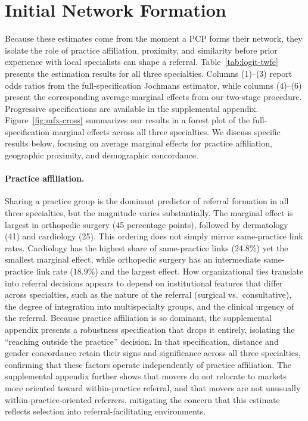 \documentclass[12pt]{article}
\begin{document}

\section{Initial Network Formation}
\label{sec:formation}

Because these estimates come from the moment a PCP forms their network, they isolate the role of practice affiliation, proximity, and similarity before prior experience with local specialists can shape a referral. Table~\ref{tab:logit-twfe} presents the estimation results for all three specialties. Columns (1)--(3) report odds ratios from the full-specification Jochmans estimator, while columns (4)--(6) present the corresponding average marginal effects from our two-stage procedure. Progressive specifications are available in the supplemental appendix. Figure~\ref{fig:mfx-cross} summarizes our results in a forest plot of the full-specification marginal effects across all three specialties. We discuss specific results below, focusing on average marginal effects for practice affiliation, geographic proximity, and demographic concordance.

\paragraph{Practice affiliation.} Sharing a practice group is the dominant predictor of referral formation in all three specialties, but the magnitude varies substantially. The marginal effect is largest in orthopedic surgery (45 percentage points), followed by dermatology (41) and cardiology (25). This ordering does not simply mirror same-practice link rates. Cardiology has the highest share of same-practice links (24.8\%) yet the smallest marginal effect, while orthopedic surgery has an intermediate same-practice link rate (18.9\%) and the largest effect. How organizational ties translate into referral decisions appears to depend on institutional features that differ across specialties, such as the nature of the referral (surgical vs.\ consultative), the degree of integration into multispecialty groups, and the clinical urgency of the referral. Because practice affiliation is so dominant, the supplemental appendix presents a robustness specification that drops it entirely, isolating the ``reaching outside the practice'' decision. In that specification, distance and gender concordance retain their signs and significance across all three specialties, confirming that these factors operate independently of practice affiliation. The supplemental appendix further shows that movers do not relocate to markets more oriented toward within-practice referral, and that movers are not unusually within-practice-oriented referrers, mitigating the concern that this estimate reflects selection into referral-facilitating environments.
\end{document}
